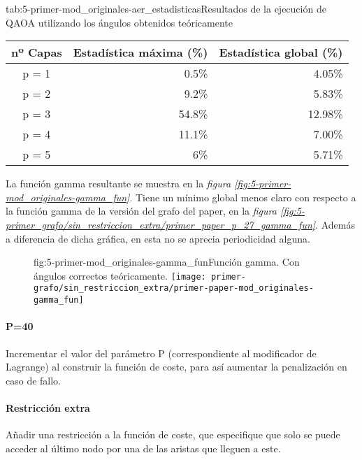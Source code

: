 \begin{table}[htbp]{tab:5-primer-mod_originales-aer_estadisticas}{Resultados de la ejecución de QAOA utilizando los ángulos obtenidos teóricamente}
  \centering
  \begin{tabular}{|c|r|r|}
    \hline
    \textbf{nº Capas} & \textbf{Estadística máxima (\%)} & \textbf{Estadística global (\%)} \\ \hline
    p = 1             &  0.5\%                           &  4.05\%                          \\ \hline
    p = 2             &  9.2\%                           &  5.83\%                          \\ \hline
    p = 3             & 54.8\%                           & 12.98\%                          \\ \hline
    p = 4             & 11.1\%                           &  7.00\%                          \\ \hline
    p = 5             &    6\%                           &  5.71\%                          \\ \hline
  \end{tabular}
\end{table}

La función gamma resultante se muestra en la \textit{figura \ref{fig:5-primer-mod_originales-gamma_fun}}. Tiene un mínimo global menos claro con respecto a la función gamma de la versión del grafo del paper, en la \textit{figura \ref{fig:5-primer_grafo/sin_restriccion_extra/primer_paper_p_27_gamma_fun}}. Además a diferencia de dicha gráfica, en esta no se aprecia periodicidad alguna.
\begin{figure}[htbp]{fig:5-primer-mod_originales-gamma_fun}{Función gamma. Con ángulos correctos teóricamente.}
  \centering
  \texttt{[image: primer-grafo/sin\_restriccion\_extra/primer-paper-mod\_originales-gamma\_fun]}
\end{figure}

\paragraph{P=40}
Incrementar el valor del parámetro P (correspondiente al modificador de Lagrange)
al construir la función de coste, para así aumentar la penalización en caso de fallo.

\paragraph{Restricción extra}
Añadir una restricción a la función de coste, que especifique que solo se puede acceder al último nodo por una de las aristas que lleguen a este.

